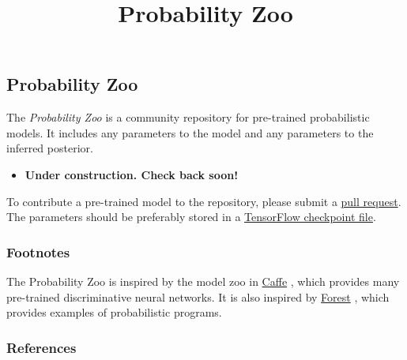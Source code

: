 \title{Probability Zoo}

\subsection{Probability Zoo}

The \emph{Probability Zoo} is a community repository for pre-trained
probabilistic models. It includes any parameters to the model and any
parameters to the inferred posterior.

\begin{itemize}
\item \textbf{Under construction. Check back soon!}
\end{itemize}

To contribute a pre-trained model to the repository, please submit a
\href{https://github.com/blei-lab/edward/pulls}{pull request}.
The parameters should be preferably stored in a
\href{https://www.tensorflow.org/versions/master/how_tos/variables/}
{TensorFlow checkpoint file}.

\subsubsection{Footnotes}

The Probability Zoo is inspired by the model zoo in
\href{http://caffe.berkeleyvision.org}{Caffe} \citep{jia2014caffe},
which provides many pre-trained discriminative neural networks.
It is also inspired by \href{http://forestdb.org}{Forest}
\citep{stuhlmueller2012forest}, which
provides examples of probabilistic programs.

\subsubsection{References}\label{references}
